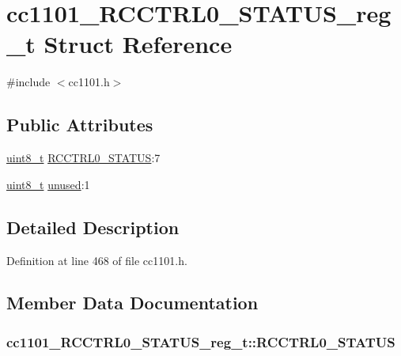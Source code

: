 \hypertarget{structcc1101___r_c_c_t_r_l0___s_t_a_t_u_s__reg__t}{}\section{cc1101\+\_\+\+R\+C\+C\+T\+R\+L0\+\_\+\+S\+T\+A\+T\+U\+S\+\_\+reg\+\_\+t Struct Reference}
\label{structcc1101___r_c_c_t_r_l0___s_t_a_t_u_s__reg__t}


{\ttfamily \#include $<$cc1101.\+h$>$}

\subsection*{Public Attributes}
\begin{DoxyCompactItemize}
\item 
\hyperlink{_p_e___types_8h_aba7bc1797add20fe3efdf37ced1182c5}{uint8\+\_\+t} \hyperlink{structcc1101___r_c_c_t_r_l0___s_t_a_t_u_s__reg__t_aac99c88ff646066fcf45dfd502f1bebd}{R\+C\+C\+T\+R\+L0\+\_\+\+S\+T\+A\+T\+US}\+:7
\item 
\hyperlink{_p_e___types_8h_aba7bc1797add20fe3efdf37ced1182c5}{uint8\+\_\+t} \hyperlink{structcc1101___r_c_c_t_r_l0___s_t_a_t_u_s__reg__t_a9dbf7315fb3a56b8b213282fe943b459}{unused}\+:1
\end{DoxyCompactItemize}


\subsection{Detailed Description}


Definition at line 468 of file cc1101.\+h.



\subsection{Member Data Documentation}
\subsubsection[{\texorpdfstring{R\+C\+C\+T\+R\+L0\+\_\+\+S\+T\+A\+T\+US}{RCCTRL0_STATUS}}]{ cc1101\+\_\+\+R\+C\+C\+T\+R\+L0\+\_\+\+S\+T\+A\+T\+U\+S\+\_\+reg\+\_\+t\+::\+R\+C\+C\+T\+R\+L0\+\_\+\+S\+T\+A\+T\+US}\hypertarget{structcc1101___r_c_c_t_r_l0___s_t_a_t_u_s__reg__t_aac99c88ff646066fcf45dfd502f1bebd}{}\label{structcc1101___r_c_c_t_r_l0___s_t_a_t_u_s__reg__t_aac99c88ff646066fcf45dfd502f1bebd}


